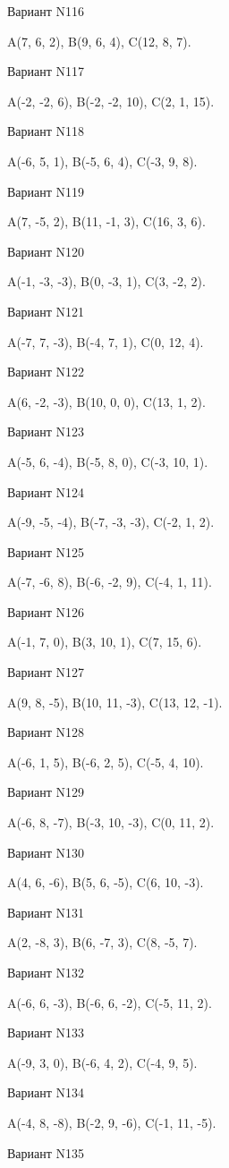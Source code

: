 \documentclass[11pt]{report}
\begin{document}
Вариант N116

A(7, 6, 2), B(9, 6, 4), C(12, 8, 7).

Вариант N117

A(-2, -2, 6), B(-2, -2, 10), C(2, 1, 15).

Вариант N118

A(-6, 5, 1), B(-5, 6, 4), C(-3, 9, 8).

Вариант N119

A(7, -5, 2), B(11, -1, 3), C(16, 3, 6).

Вариант N120

A(-1, -3, -3), B(0, -3, 1), C(3, -2, 2).

Вариант N121

A(-7, 7, -3), B(-4, 7, 1), C(0, 12, 4).

Вариант N122

A(6, -2, -3), B(10, 0, 0), C(13, 1, 2).

Вариант N123

A(-5, 6, -4), B(-5, 8, 0), C(-3, 10, 1).

Вариант N124

A(-9, -5, -4), B(-7, -3, -3), C(-2, 1, 2).

Вариант N125

A(-7, -6, 8), B(-6, -2, 9), C(-4, 1, 11).

Вариант N126

A(-1, 7, 0), B(3, 10, 1), C(7, 15, 6).

Вариант N127

A(9, 8, -5), B(10, 11, -3), C(13, 12, -1).

Вариант N128

A(-6, 1, 5), B(-6, 2, 5), C(-5, 4, 10).

Вариант N129

A(-6, 8, -7), B(-3, 10, -3), C(0, 11, 2).

Вариант N130

A(4, 6, -6), B(5, 6, -5), C(6, 10, -3).

Вариант N131

A(2, -8, 3), B(6, -7, 3), C(8, -5, 7).

Вариант N132

A(-6, 6, -3), B(-6, 6, -2), C(-5, 11, 2).

Вариант N133

A(-9, 3, 0), B(-6, 4, 2), C(-4, 9, 5).

Вариант N134

A(-4, 8, -8), B(-2, 9, -6), C(-1, 11, -5).

Вариант N135
\end{document}
